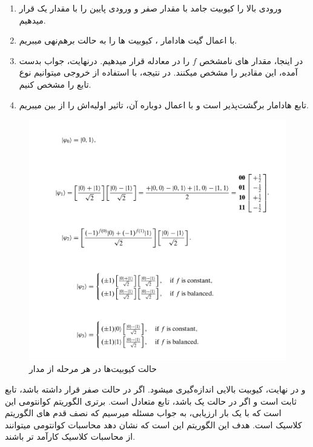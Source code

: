 \begin{enumerate}\addtocounter{enumi}{-1}
\item
ورودی بالا را کیوبیت جامد با مقدار صفر و ورودی پایین را با مقدار یک قرار میدهیم.
\item
با اعمال گیت هادامار
،
کیوبیت ها را به حالت برهم‌نهی میبریم. 
\item
در اینجا، مقدار های نامشخص $f$ را در معادله قرار میدهیم. درنهایت، جواب بدست آمده، این مقادیر را مشخص میکنند. در نتیجه، با استفاده از خروجی میتوانیم نوع تابع را مشخص کنیم.
\item
تابع هادامار برگشت‌پذیر است و با اعمال دوباره آن، تاثیر اولیه‌اش را از بین میبریم.
\end{enumerate}
\begin{figure}
\centerline{\includegraphics[width=1\textwidth]{deutschproof.jpg}}
\caption{حالت کیوبیت‌ها در هر مرحله از مدار}
\label{fig:deutschproof}
\end{figure}
و در نهایت، کیوبیت بالایی اندازه‌گیری میشود. اگر در حالت صفر قرار داشته باشد، تابع ثابت است و اگر در حالت یک باشد، تابع متعادل است. برتری الگوریتم کوانتومی این است که با یک بار ارزیابی، به جواب مسئله میرسیم که نصف قدم های الگوریتم کلاسیک است. هدف این الگوریتم این است که نشان دهد محاسبات کوانتومی میتوانند از محاسبات کلاسیک کارآمد تر باشند.
\cite{cambridgebook}

